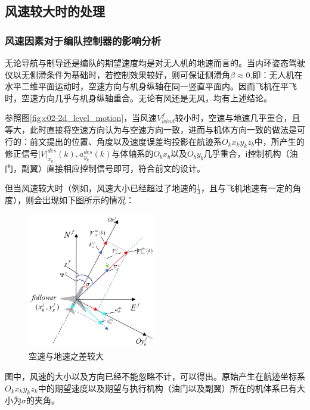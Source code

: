 \subsection{风速较大时的处理} 
\subsubsection*{风速因素对于编队控制器的影响分析}
无论导航与制导还是编队的期望速度均是对无人机的地速而言的。当内环姿态驾驶仪以无侧滑条件为基础时，若控制效果较好，则可保证侧滑角$\beta\approx 0$,即：无人机在水平二维平面运动时，空速方向与机身纵轴在同一竖直平面内。因而飞机在平飞时，空速方向几乎与机身纵轴重合。无论有风还是无风，均有上述结论。

参照图\ref{fig:c02-2d_level_motion}，当风速$V_{wind}^f$较小时，空速与地速几乎重合，且等大，此时直接将空速方向认为与空速方向一致，进而与机体方向一致的做法是可行的：前文提出的位置、角度以及速度误差均投影在航迹系$O_kx_ky_kz_b$中，所产生的修正信号$|V|_{x_k}^{des}(k),a_{y_k}^{des}(k)$与体轴系的$O_bx_b$以及$O_by_b$几乎重合，i控制机构（油门，副翼）直接相应控制信号即可，符合前文的设计。

但当风速较大时（例如，风速大小已经超过了地速的$\frac{1}{3}$，且与飞机地速有一定的角度），则会出现如下图所示的情况：
\begin{figure}[H]
    \centering
    \includegraphics[width=0.5\textwidth]{figures/c3/heavy_wind.png}
    \caption{空速与地速之差较大}\label{fig:heavy_wind}
\end{figure}
图中，风速的大小以及方向已经不能忽略不计，可以得出。原始产生在航迹坐标系$O_kx_ky_kz_k$中的期望速度以及期望与执行机构（油门以及副翼）所在的机体系已有大小为$\sigma$的夹角。
